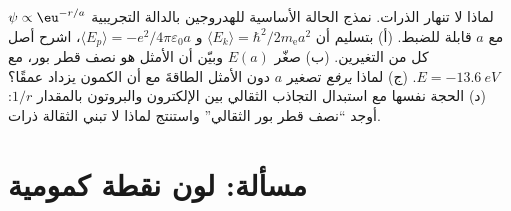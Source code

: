 \begin{exercise}[$\star\star\star$]\label{exo:b3:schrodinger-three-dimensions:12}
لماذا لا تنهار الذرات. نمذج الحالة الأساسية للهدروجين
بالدالة التجريبية $\psi \propto \eu^{-r/a}$ مع $a$ قابلة للضبط. (أ)
بتسليم أن $\langle E_k\rangle = \hbar^2/2m_{\text{e}}a^2$ و
$\langle E_p\rangle = -e^2/4\pi\varepsilon_0a$، اشرح أصل
كل من التغيرين. (ب) صغّر $E(a)$ وبيّن أن الأمثل هو
نصف قطر بور، مع $E = \qty{-13.6}{eV}$. (ج) لماذا \emph{يرفع}
تصغير $a$ دون الأمثل الطاقةَ مع أن الكمون يزداد عمقًا؟ (د)
الحجة نفسها مع استبدال التجاذب الثقالي بين الإلكترون والبروتون
بالمقدار $1/r$: أوجد ``نصف قطر بور الثقالي'' واستنتج
لماذا لا تبني الثقالة ذرات.
\end{exercise}

\section{مسألة: لون نقطة كمومية}


